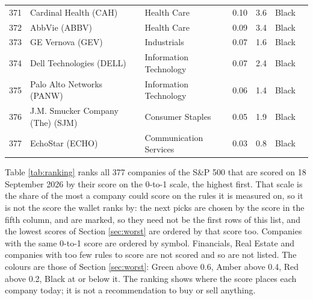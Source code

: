 \documentclass[11pt,a4paper]{article}
\begin{document}
{\begin{longtable}{r p{4.4cm} p{2.8cm} r r l l}
371 & Cardinal Health (CAH) & Health Care & 0.10 & 3.6 & \cellcolor[HTML]{BFBFBF}Black &  \\
372 & AbbVie (ABBV) & Health Care & 0.09 & 3.4 & \cellcolor[HTML]{BFBFBF}Black &  \\
373 & GE Vernova (GEV) & Industrials & 0.07 & 1.6 & \cellcolor[HTML]{BFBFBF}Black &  \\
374 & Dell Technologies (DELL) & Information Technology & 0.07 & 2.4 & \cellcolor[HTML]{BFBFBF}Black &  \\
375 & Palo Alto Networks (PANW) & Information Technology & 0.06 & 1.4 & \cellcolor[HTML]{BFBFBF}Black &  \\
376 & J.M. Smucker Company (The) (SJM) & Consumer Staples & 0.05 & 1.9 & \cellcolor[HTML]{BFBFBF}Black &  \\
377 & EchoStar (ECHO) & Communication Services & 0.03 & 0.8 & \cellcolor[HTML]{BFBFBF}Black &  \\
\hline
\end{longtable}}
Table \ref{tab:ranking} ranks all 377 companies of the S\&P 500 that are scored on 18 September 2026 by their score on the 0-to-1 scale, the highest first. That scale is the share of the most a company could score on the rules it is measured on, so it is not the score the wallet ranks by: the next picks are chosen by the score in the fifth column, and are marked, so they need not be the first rows of this list, and the lowest scores of Section \ref{sec:worst} are ordered by that score too. Companies with the same 0-to-1 score are ordered by symbol. Financials, Real Estate and companies with too few rules to score are not scored and so are not listed. The colours are those of Section \ref{sec:worst}: Green above 0.6, Amber above 0.4, Red above 0.2, Black at or below it. The ranking shows where the score places each company today; it is not a recommendation to buy or sell anything.
\end{document}
